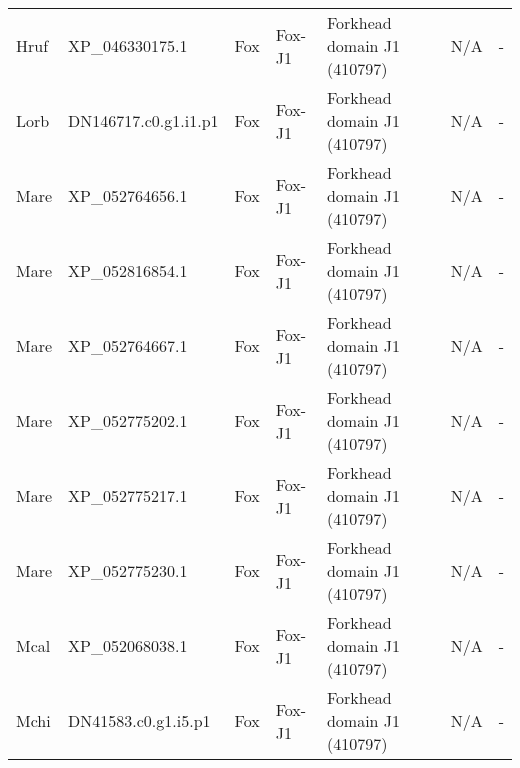 \documentclass[../main.tex]{subfiles}
\begin{document}
\begin{landscape}
\begin{longtable}{lllllll}
		Hruf           & XP\_046330175.1       & Fox            & Fox-J1              & Forkhead domain J1 (410797)                 & N/A                                                                    & -                    \\
		Lorb           & DN146717.c0.g1.i1.p1  & Fox            & Fox-J1              & Forkhead domain J1 (410797)                 & N/A                                                                    & -                    \\
		Mare           & XP\_052764656.1       & Fox            & Fox-J1              & Forkhead domain J1 (410797)                 & N/A                                                                    & -                    \\
		Mare           & XP\_052816854.1       & Fox            & Fox-J1              & Forkhead domain J1 (410797)                 & N/A                                                                    & -                    \\
		Mare           & XP\_052764667.1       & Fox            & Fox-J1              & Forkhead domain J1 (410797)                 & N/A                                                                    & -                    \\
		Mare           & XP\_052775202.1       & Fox            & Fox-J1              & Forkhead domain J1 (410797)                 & N/A                                                                    & -                    \\
		Mare           & XP\_052775217.1       & Fox            & Fox-J1              & Forkhead domain J1 (410797)                 & N/A                                                                    & -                    \\
		Mare           & XP\_052775230.1       & Fox            & Fox-J1              & Forkhead domain J1 (410797)                 & N/A                                                                    & -                    \\
		Mcal           & XP\_052068038.1       & Fox            & Fox-J1              & Forkhead domain J1 (410797)                 & N/A                                                                    & -                    \\
		Mchi           & DN41583.c0.g1.i5.p1   & Fox            & Fox-J1              & Forkhead domain J1 (410797)                 & N/A                                                                    & -                    \\

\end{longtable}
\end{landscape}
\end{document}
